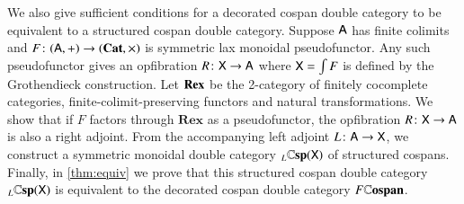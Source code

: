 \documentclass[reqno]{amsart}
\begin{document}
We also give sufficient conditions for a decorated cospan double category to be equivalent to a structured cospan double category. 
Suppose $\mathsf{A}$ has finite colimits and $F \colon (\mathsf{A} , +) \to (\mathbf{Cat}, \times)$ is 
symmetric lax monoidal pseudofunctor.   Any such pseudofunctor gives an opfibration 
$R \colon \mathsf{X} \to \mathsf{A}$ where $\mathsf{X} = \int F$ is defined by the Grothendieck construction.
Let $\mathbf{Rex}$ be the 2-category of finitely cocomplete categories, finite-colimit-preserving
functors and natural transformations.  We show that if $F$ factors through $\mathbf{Rex}$ as
a pseudofunctor, the opfibration $R \colon \mathsf{X} \to \mathsf{A}$ is also a right adjoint.  From the accompanying left adjoint $L \colon \mathsf{A} \to \mathsf{X}$, we  construct a symmetric monoidal double category ${}_L \mathbf{\mathbb Csp}(\mathsf{X})$ of structured cospans.  Finally, in \cref{thm:equiv} we prove that this structured cospan double category ${}_L \mathbf{\mathbb Csp}(\mathsf{X})$ is equivalent to the decorated cospan double category $F \mathbf{\mathbb Cospan}$. 
\end{document}
